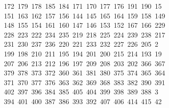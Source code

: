 \begin{tabbing}
\ 172\ 179\ 178\ 185\ 184\ 171\ 170\ 177\ 176\ 191\ 190\ 15\\[0pt]
\ 151\ 163\ 162\ 157\ 156\ 144\ 145\ 165\ 164\ 159\ 158\ 149\\[0pt]
\>\ 148\ 155\ 154\ 161\ 160\ 147\ 146\ 153\ 152\ 167\ 166\ 229\\[0pt]
\>\ 228\ 223\ 222\ 234\ 235\ 219\ 218\ 225\ 224\ 239\ 238\ 217\ \\[0pt]
\ 231\ 230\ 237\ 236\ 220\ 221\ 233\ 232\ 227\ 226\ 205\ 2\\[0pt]
\ 199\ 198\ 210\ 211\ 195\ 194\ 201\ 200\ 215\ 214\ 193\ 19\\[0pt]
\ 207\ 206\ 213\ 212\ 196\ 197\ 209\ 208\ 203\ 202\ 366\ 367\\[0pt]
\>\ 379\ 378\ 373\ 372\ 360\ 361\ 381\ 380\ 375\ 374\ 365\ 364\\[0pt]
\>\ 371\ 370\ 377\ 376\ 363\ 362\ 369\ 368\ 383\ 382\ 390\ 391\ \\[0pt]
\ 402\ 397\ 396\ 384\ 385\ 405\ 404\ 399\ 398\ 389\ 388\ 3\\[0pt]
\ 394\ 401\ 400\ 387\ 386\ 393\ 392\ 407\ 406\ 414\ 415\ 42\\[0pt]

\end{tabbing}
